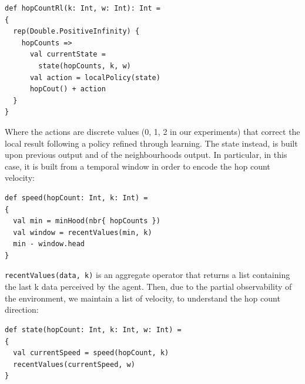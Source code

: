 \documentclass[conference]{IEEEtran}
\begin{document}
 \begin{verbatim}
def hopCountRl(k: Int, w: Int): Int = 
{
  rep(Double.PositiveInfinity) { 
    hopCounts => 
      val currentState = 
        state(hopCounts, k, w)
      val action = localPolicy(state)
      hopCout() + action
  }
}
\end{verbatim}

Where the actions are discrete values (0, 1, 2 in our experiments) that correct the local result following a policy refined through learning.
%
The state instead, is built upon previous output and of the neighbourhoods output.
 In particular, in this case, it is built from a temporal window in order to encode the hop count velocity:
\begin{verbatim}
def speed(hopCount: Int, k: Int) =
{
  val min = minHood(nbr{ hopCounts })
  val window = recentValues(min, k)
  min - window.head 
}
\end{verbatim}
\texttt{recentValues(data, k)} is an aggregate operator that returns a list containing the last k data perceived by the agent.
Then, due to the partial observability of the environment, we maintain a 
 list of velocity, to understand the hop count direction:

 \begin{verbatim}
def state(hopCount: Int, k: Int, w: Int) =
{
  val currentSpeed = speed(hopCount, k)
  recentValues(currentSpeed, w)
}
\end{verbatim}
\end{document}

